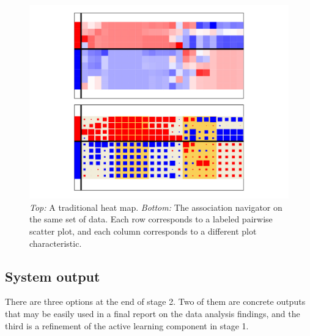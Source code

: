 \begin{figure}[htb]
	\begin{center}
		\includegraphics[width=1\linewidth]{ch-visualizer/figures/heatmap}
		\caption[Heat map versus association navigator]{\textit{Top:} A 
		traditional heat map. \textit{Bottom:} The association navigator on the 
		same set of data. Each row corresponds to a labeled pairwise scatter 
		plot, and each column corresponds to a different plot characteristic.}
		\label{fig:visualizer:heatmap}
	\end{center}
\end{figure}

\subsection{System output}
\label{sec:visualizer:plotgeneration:output}

There are three options at the end of stage 2. Two of them are concrete outputs 
that may be easily used in a final report on the data analysis findings, and 
the third is a refinement of the active learning component in stage 1.

